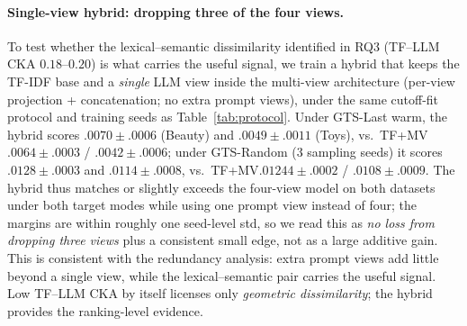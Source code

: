 \documentclass[sigconf,natbib=true,anonymous]{acmart}
\newcommand{\tfidf}{\textsc{TF-IDF}\xspace}
\newcommand{\tfmv}{\textsc{TF+MV}\xspace}
\begin{document}
\paragraph{Single-view hybrid: dropping three of the four views.}
To test whether the lexical--semantic dissimilarity identified in RQ3 (TF--LLM CKA $0.18$--$0.20$) is what carries the useful signal, we train a hybrid that keeps the \tfidf base and a \emph{single} LLM view inside the multi-view architecture (per-view projection + concatena\-tion; no extra prompt views), under the same cutoff-fit protocol and training seeds as Table~\ref{tab:protocol}.
Under GTS-Last warm, the hybrid scores $.0070\pm.0006$ (Beauty) and $.0049\pm.0011$ (Toys), vs.\ \tfmv $.0064\pm.0003$ / $.0042\pm.0006$; under GTS-Random (3 sampling seeds) it scores $.0128\pm.0003$ and $.0114\pm.0008$, vs.\ \tfmv $.01244\pm.0002$ / $.0108\pm.0009$.
The hybrid thus matches or slightly exceeds the four-view model on both datasets under both target modes while using one prompt view instead of four; the margins are within roughly one seed-level std, so we read this as \emph{no loss from dropping three views} plus a consistent small edge, not as a large additive gain.
This is consistent with the redundancy analysis: extra prompt views add little beyond a single view, while the lexical--semantic pair carries the useful signal.
Low TF--LLM CKA by itself licenses only \emph{geometric dissimilarity}; the hybrid provides the ranking-level evidence.
\end{document}
